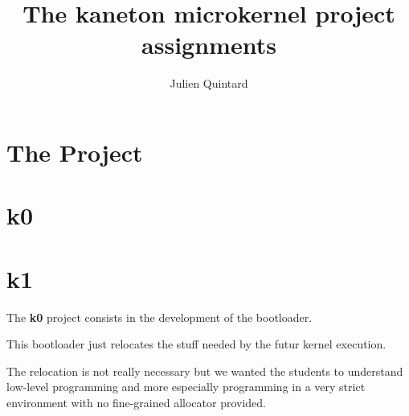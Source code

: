 
%
%



%
%


%
%

\title{The kaneton microkernel project assignments}

%
%

\author{\small{Julien Quintard}}

%
%



%
%

\maketitle

%
%

%
%

\section{The Project}

%
%

\section{k0}

%
%

\section{k1}

The \textbf{k0} project consists in the development of the bootloader.

This bootloader just relocates the stuff needed by the futur kernel
execution.

The relocation is not really necessary but we wanted the students
to understand low-level programming and more especially programming
in a very strict environment with no fine-grained allocator provided.

